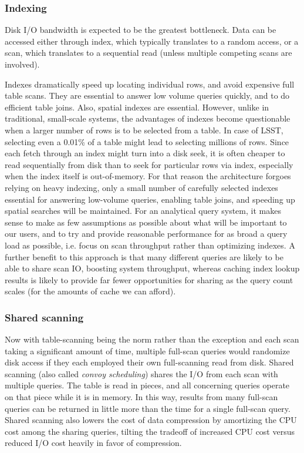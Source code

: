 \documentclass[DM,lsstdraft,toc]{lsstdoc}
\begin{document}
\subsubsection{Indexing}\label{indexing}

Disk I/O bandwidth is expected to be the greatest bottleneck. Data can
be accessed either through index, which typically translates to a random
access, or a scan, which translates to a sequential read (unless
multiple competing scans are involved).

Indexes dramatically speed up locating individual rows, and avoid
expensive full table scans. They are essential to answer low volume
queries quickly, and to do efficient table joins. Also, spatial indexes
are essential. However, unlike in traditional, small-scale systems, the
advantages of indexes become questionable when a larger number of rows
is to be selected from a table. In case of LSST, selecting even a 0.01\%
of a table might lead to selecting millions of rows. Since each fetch
through an index might turn into a disk seek, it is often cheaper to
read sequentially from disk than to seek for particular rows via index,
especially when the index itself is out-of-memory. For that reason the
architecture forgoes relying on heavy indexing, only a small number of
carefully selected indexes essential for answering low-volume queries,
enabling table joins, and speeding up spatial searches will be
maintained. For an analytical query system, it makes sense to make as
few assumptions as possible about what will be important to our users,
and to try and provide reasonable performance for as broad a query load
as possible, i.e. focus on scan throughput rather than optimizing
indexes. A further benefit to this approach is that many different
queries are likely to be able to share scan IO, boosting system
throughput, whereas caching index lookup results is likely to provide
far fewer opportunities for sharing as the query count scales (for the
amounts of cache we can afford).

\subsubsection{Shared scanning}\label{shared-scanning}

Now with table-scanning being the norm rather than the exception and
each scan taking a significant amount of time, multiple full-scan
queries would randomize disk access if they each employed their own
full-scanning read from disk. Shared scanning (also called \emph{convoy
scheduling}) shares the I/O from each scan with multiple queries. The
table is read in pieces, and all concerning queries operate on that
piece while it is in memory. In this way, results from many full-scan
queries can be returned in little more than the time for a single
full-scan query. Shared scanning also lowers the cost of data
compression by amortizing the CPU cost among the sharing queries,
tilting the tradeoff of increased CPU cost versus reduced I/O cost
heavily in favor of compression.
\end{document}
